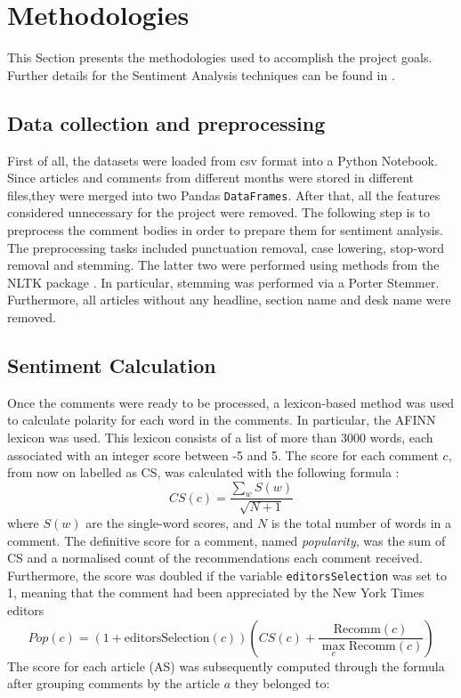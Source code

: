 \section{Methodologies}
\label{Metho}

This Section presents the methodologies used to accomplish the project goals. Further details for the Sentiment Analysis techniques can be found in \cite{Aggarwal}.

\subsection{Data collection and preprocessing}

First of all, the datasets were loaded from csv format into a Python Notebook. Since articles and comments from different months were stored in different files,they were merged into two Pandas {\tt DataFrames}. After that, all the features considered unnecessary for the project were removed. 
The following step is to preprocess the comment bodies in order to prepare them for sentiment analysis. The preprocessing tasks included punctuation removal, case lowering, stop-word removal and stemming. The latter two were performed using methods from the NLTK package \cite{NLTK}. In particular, stemming was performed via a Porter Stemmer.
Furthermore, all articles without any headline, section name and desk name were removed.

\subsection{Sentiment Calculation}
Once the comments were ready to be processed, a lexicon-based method was used to calculate polarity for each word in the comments. In particular, the AFINN lexicon \cite{AFINN} was used. This lexicon consists of a list of more than 3000 words, each associated with an integer score between -5 and 5. The score for each comment $c$, from now on labelled as CS, was calculated with the following formula \cite{Guardian}:
\begin{equation}
CS(c) = \frac{\sum_{w} S(w)}{\sqrt{N+1}}
\end{equation}
where $S(w)$ are the single-word scores, and $N$ is the total number of words in a comment. The definitive score for a comment, named \textit{popularity}, was the sum of CS and a normalised count of the recommendations each comment received. Furthermore, the score was doubled if the variable {\tt editorsSelection} was set to 1, meaning that the comment had been appreciated by the New York Times editors
\begin{equation}
\label{Popc}
Pop (c) = (1 + \mbox{editorsSelection} (c) ) \left( CS(c) + \frac{\mbox{Recomm} (c)}{\max_c{\mbox{Recomm}(c)}} \right)
\end{equation}
The score for each article (AS) was subsequently computed through the formula after grouping comments by the article $a$ they belonged to:

